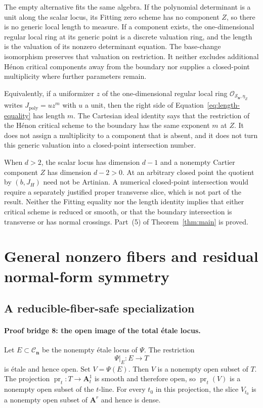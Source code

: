 \documentclass[11pt]{article}
\theoremstyle{definition}
\theoremstyle{remark}
\newcommand{\A}{\mathbf A}
\newcommand{\cC}{\mathcal C}
\newcommand{\cS}{\mathcal S}
\newcommand{\bn}{\mathbf n}
\begin{document}
The empty alternative fits the same algebra.  If the polynomial determinant
is a unit along the scalar locus, its Fitting zero scheme has no component
$Z$, so there is no generic local length to measure.  If a component exists,
the one-dimensional regular local ring at its generic point is a discrete
valuation ring, and the length is the valuation of its nonzero determinant
equation.  The base-change isomorphism preserves that valuation on
restriction.  It neither excludes additional Hénon critical components away
from the boundary nor supplies a closed-point multiplicity where further
parameters remain.

Equivalently, if a uniformizer $z$ of the one-dimensional regular local ring
$\mathcal O_{\cS_{\bn},\eta_Z}$ writes
$J_{\mathrm{poly}}=u z^m$ with $u$ a unit, then the right side of
Equation~\eqref{eq:length-equality} has length $m$.  The Cartesian ideal
identity says that the restriction of the Hénon critical scheme to the
boundary has the same exponent $m$ at $Z$.  It does not assign a
multiplicity to a component that is absent, and it does not turn this
generic valuation into a closed-point intersection number.

When $d>2$, the scalar locus has dimension $d-1$ and a nonempty Cartier
component $Z$ has dimension $d-2>0$.  At an arbitrary closed point the
quotient by $(b,J_H)$ need not be Artinian.  A numerical closed-point
intersection would require a separately justified proper transverse slice,
which is not part of the result.  Neither the Fitting equality nor the length
identity implies that either critical scheme is reduced or smooth, or that
the boundary intersection is transverse or has normal crossings.  Part~(5)
of Theorem~\ref{thm:main} is proved.

\section{General nonzero fibers and residual normal-form symmetry}
\label{sec:fibers}

\subsection{A reducible-fiber-safe specialization}

\paragraph{Proof bridge 8: the open image of the total étale locus.}
Let $E\subset\cC_{\bn}$ be the nonempty étale locus of $\Psi$.  The
restriction
\[
  \Psi|_E:E\longrightarrow T
\]
is étale and hence open.  Set $V=\Psi(E)$.  Then $V$ is a nonempty open
subset of $T$.  The projection
$\operatorname{pr}_t:T\to\A^1_t$ is smooth and therefore open, so
$\operatorname{pr}_t(V)$ is a nonempty open subset of the $t$-line.  For
every $t_0$ in this projection, the slice $V_{t_0}$ is a nonempty open
subset of $\A^r$ and hence is dense.
\end{document}
